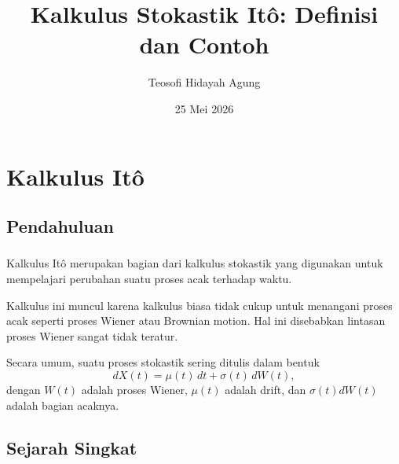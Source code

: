 \documentclass[aspectratio=169,11pt]{beamer}
\date{25 Mei 2026}
\title[Kalkulus Stokastik]{Kalkulus Stokastik Itô: Definisi dan Contoh}
\author[Tetew]{Teosofi Hidayah Agung}
\institute[Matematika ITS]{Matematika ITS}
\theoremstyle{definition}
\begin{document}
\begin{frame}
  \titlepage
\end{frame}


\section{Kalkulus Itô}

\subsection{Pendahuluan}

\begin{frame}
  \frametitle{\insertsection}
  \framesubtitle{\insertsubsection}

  Kalkulus Itô merupakan bagian dari kalkulus stokastik yang digunakan untuk
  mempelajari perubahan suatu proses acak terhadap waktu.

  \medskip

  Kalkulus ini muncul karena kalkulus biasa tidak cukup untuk menangani proses
  acak seperti proses Wiener atau Brownian motion. Hal ini disebabkan lintasan
  proses Wiener sangat tidak teratur.

  \medskip

  Secara umum, suatu proses stokastik sering ditulis dalam bentuk
  \[
    dX(t)=\mu(t)\,dt+\sigma(t)\,dW(t),
  \]
  dengan $W(t)$ adalah proses Wiener, $\mu(t)$ adalah drift, dan
  $\sigma(t)dW(t)$ adalah bagian acaknya.

\end{frame}

\subsection{Sejarah Singkat}
\end{document}
